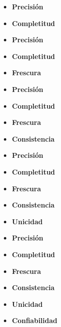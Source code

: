 \documentclass{fancyslides}
\begin{document}
\begin{frame}
\misc
{
\begin{itemize}
  \item \textbf{Precisión}
  \item \textbf{Completitud}
\end{itemize}

}
\end{frame}

\begin{frame}
\misc
{
\begin{itemize}
  \item \textbf{Precisión}
  \item \textbf{Completitud}
  \item \textbf{Frescura}
\end{itemize}

}
\end{frame}

\begin{frame}
\misc
{
\begin{itemize}
  \item \textbf{Precisión}
  \item \textbf{Completitud}
  \item \textbf{Frescura}
  \item \textbf{Consistencia}
\end{itemize}

}
\end{frame}

\begin{frame}
\misc
{
\begin{itemize}
  \item \textbf{Precisión}
  \item \textbf{Completitud}
  \item \textbf{Frescura}
  \item \textbf{Consistencia}
  \item \textbf{Unicidad}
\end{itemize}

}
\end{frame}

\begin{frame}
\misc
{
\begin{itemize}
  \item \textbf{Precisión}
  \item \textbf{Completitud}
  \item \textbf{Frescura}
  \item \textbf{Consistencia}
  \item \textbf{Unicidad}
  \item \textbf{Confiabilidad}
\end{itemize}

}
\end{frame}
\end{document}
